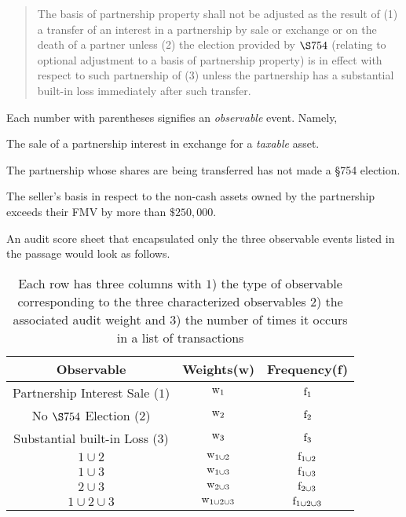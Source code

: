 {\tiny
\begin{quote}
  The basis of partnership property shall not be adjusted as the
  result of (1) a transfer of an interest in a partnership by sale or
  exchange or on the death of a partner unless (2) the election
  provided by $\S 754$ (relating to optional adjustment to a basis of
  partnership property) is in effect with respect to such partnership
  of (3) unless the partnership has a substantial built-in loss
  immediately after such transfer.
\end{quote}
}

Each number with parentheses signifies an \textit{observable}
event. Namely,
\begin{inparaenum}[(1)]
  \item The sale of a partnership interest in exchange for a
    \textit{taxable} asset.
  \item The partnership whose shares are being transferred has not
    made a \S 754 election.
  \item The seller's basis in respect to the non-cash assets owned by
    the partnership exceeds their FMV by more than $\$250,000$.
\end{inparaenum}
An audit score sheet that encapsulated only the three observable
events listed in the passage would look as follows.
\begin{table}[!htb]
  \small
  \centering
  \begin{tabular}{c|c|c}
    \textbf{Observable} & \textbf{Weights(w)} & \textbf{Frequency(f)} \\
    \hline
    Partnership Interest Sale ($1$) & $\textnormal{w}_1$ & $\textnormal{f}_1$ \\
    \hline
    No $\S 754$ Election ($2$) & $\textnormal{w}_{2}$ & $\textnormal{f}_{2}$ \\
    \hline
    Substantial built-in Loss ($3$) & $\textnormal{w}_{3}$ & $\textnormal{f}_{3}$ \\
    \hline
    $1 \cup 2$ & $\textnormal{w}_{1 \cup 2}$ & $\textnormal{f}_{1 \cup 2}$ \\
    \hline
    $1 \cup 3$ & $\textnormal{w}_{1 \cup 3}$ & $\textnormal{f}_{1 \cup 3}$ \\
    \hline
    $2 \cup 3$ & $\textnormal{w}_{2 \cup 3}$ & $\textnormal{f}_{2 \cup 3}$ \\
    \hline
    $1 \cup 2 \cup 3$ & $\textnormal{w}_{1 \cup 2 \cup 3}$ & $\textnormal{f}_{1 \cup 2 \cup 3}$ \\
  \end{tabular}
  \caption{{\small Each row has three columns with $1$) the type of
      observable corresponding to the three characterized observables
      $2$) the associated audit weight and $3$) the number of times it
      occurs in a list of transactions}}
  \label{tab:audit_score_sheet}
\end{table}

